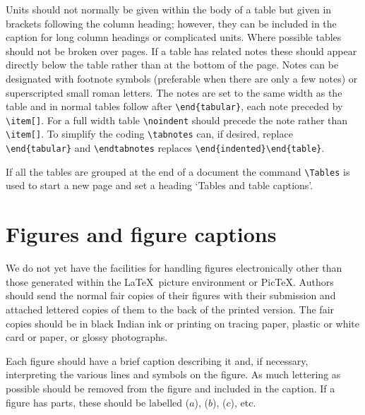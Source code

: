 Units should not normally be given within the body of a table but
given in brackets following the column heading; however, they can be
included in the caption for long column headings or complicated units.
Where possible tables should not be broken over pages.
If a table has related notes these should appear directly below the table
rather than at the bottom of the page. Notes can be designated with
footnote symbols (preferable when there are only a few notes) or
superscripted small roman letters. The notes are set to the same width as
the table and in normal tables follow after \verb"\end{tabular}", each
note preceded by \verb"\item[]". For a full width table \verb"\noindent"
should precede the note rather than \verb"\item[]". To simplify the coding
\verb"\tabnotes" can, if desired, replace \verb"\end{tabular}" and
\verb"\endtabnotes" replaces
\verb"\end{indented}\end{table}".

If all the tables are grouped at the end of a document
the command \verb"\Tables" is used to start a new page and
set a heading `Tables and table captions'.

\section{Figures and figure captions}
We do not yet have the facilities for handling figures electronically
other than those generated within the \LaTeX\ picture environment
or Pic\TeX.
Authors should send the normal fair copies of their figures with their
submission and attached lettered copies of them to the back of the
printed version. The fair copies should be in black
Indian ink or printing on tracing paper, plastic or white card or
paper,
or glossy photographs.

Each figure should have a brief caption describing it and, if
necessary, interpreting the various lines and symbols on the figure.
As much lettering as possible should be removed from the figure and
included in the caption. If a figure has parts, these should be
labelled ($a$), ($b$), ($c$), etc.


